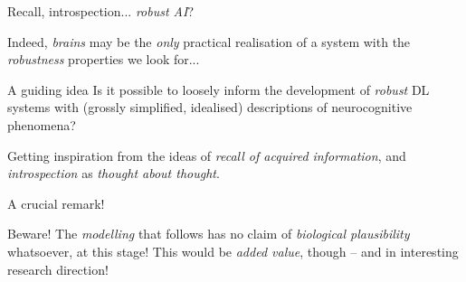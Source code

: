 
\begin{frame}{ Recall, introspection... \textit{robust AI}?}

    Indeed, \textit{brains} may be the \textit{only} practical realisation of a system with the \textit{robustness} properties we look for...
    \hfill\break
    \begin{block}{ A guiding idea}
        Is it possible to loosely inform the development of \textit{robust} DL systems with (grossly simplified, idealised) descriptions of \alert{neurocognitive} phenomena?
    \end{block}
    \hfill\break
    Getting inspiration from the ideas of  \textit{\alert{recall} of acquired information}, and \textit{\alert{introspection}} as \textit{thought about thought}.
\end{frame}

\begin{frame}{ A crucial remark!}
    \begin{block}{ Beware!}
        The \textit{modelling} that follows has no claim of \textit{biological plausibility} whatsoever, at this stage! This would be \textit{added value}, though -- and in interesting research direction!
    \end{block}
\end{frame}
